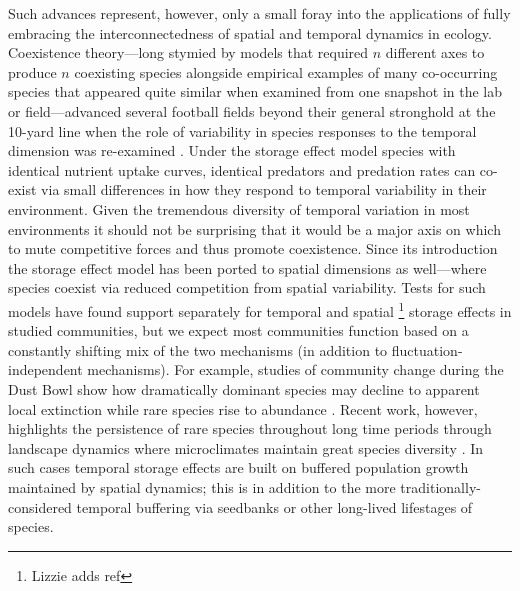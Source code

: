 \documentclass[11pt,a4paper,oneside]{article}
\begin{document}
Such advances represent, however, only a small foray into the applications of fully embracing the interconnectedness of spatial and temporal dynamics in ecology. Coexistence theory---long stymied by models that required \(n\) different axes to produce \(n\) coexisting species alongside empirical examples of many co-occurring species that appeared quite similar when examined from one snapshot in the lab or field---advanced several football fields beyond their general stronghold at the 10-yard line when the role of variability in species responses to the temporal dimension was re-examined \citep{Chesson:1997dz}. Under the storage effect model \citep{Chesson:1997dz} species with identical nutrient uptake curves, identical predators and predation rates can co-exist via small differences in how they respond to temporal variability in their environment. Given the tremendous diversity of temporal variation in most environments it should not be surprising that it would be a major axis on which to mute competitive forces and thus promote coexistence. Since its introduction the storage effect model has been ported to spatial dimensions as well---where species coexist via reduced competition from spatial variability. Tests for such models have found support separately for temporal \citep{Angert:2009} and spatial \footnote{Lizzie adds ref} storage effects in studied communities, but we expect most communities function based on a constantly shifting mix of the two mechanisms (in addition to fluctuation-independent mechanisms). For example, studies of community change during the Dust Bowl show how dramatically dominant species may decline to apparent local extinction while rare species rise to abundance \citep{Weaver1936}. Recent work, however, highlights the persistence of rare species throughout long time periods through landscape dynamics where microclimates maintain great species diversity \cite{Craine2012}. In such cases temporal storage effects are built on buffered population growth maintained by spatial dynamics; this is in addition to the more traditionally-considered temporal buffering via seedbanks or other long-lived lifestages of species. \\
\end{document}
